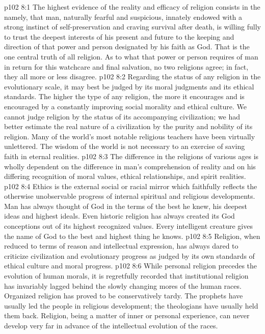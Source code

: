 \vs p102 8:1 The highest evidence of the reality and efficacy of religion consists in the  namely, that man, naturally fearful and suspicious, innately endowed with a strong instinct of self\hyp{}preservation and craving survival after death, is willing fully to trust the deepest interests of his present and future to the keeping and direction of that power and person designated by his faith as God. That is the one central truth of all religion. As to what that power or person requires of man in return for this watchcare and final salvation, no two religions agree; in fact, they all more or less disagree.
\vs p102 8:2 Regarding the status of any religion in the evolutionary scale, it may best be judged by its moral judgments and its ethical standards. The higher the type of any religion, the more it encourages and is encouraged by a constantly improving social morality and ethical culture. We cannot judge religion by the status of its accompanying civilization; we had better estimate the real nature of a civilization by the purity and nobility of its religion. Many of the world’s most notable religious teachers have been virtually unlettered. The wisdom of the world is not necessary to an exercise of saving faith in eternal realities.\plusone
\vs p102 8:3 The difference in the religions of various ages is wholly dependent on the difference in man’s comprehension of reality and on his differing recognition of moral values, ethical relationships, and spirit realities.
\pc \vs p102 8:4 Ethics is the external social or racial mirror which faithfully reflects the otherwise unobservable progress of internal spiritual and religious developments. Man has always thought of God in the terms of the best he knew, his deepest ideas and highest ideals. Even historic religion has always created its God conceptions out of its highest recognized values. Every intelligent creature gives the name of God to the best and highest thing he knows.
\vs p102 8:5 Religion, when reduced to terms of reason and intellectual expression, has always dared to criticize civilization and evolutionary progress as judged by its own standards of ethical culture and moral progress.
\vs p102 8:6 While personal religion precedes the evolution of human morals, it is regretfully recorded that institutional religion has invariably lagged behind the slowly changing mores of the human races. Organized religion has proved to be conservatively tardy. The prophets have usually led the people in religious development; the theologians have usually held them back. Religion, being a matter of inner or personal experience, can never develop very far in advance of the intellectual evolution of the races.
